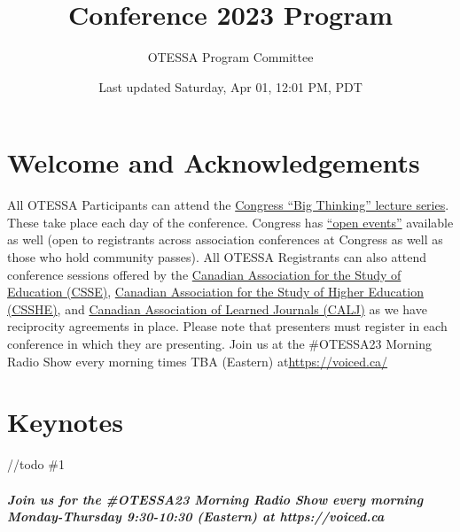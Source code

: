 \documentclass[
]{book}
\title{Conference 2023 Program}
\author{OTESSA Program Committee}
\date{Last updated Saturday, Apr 01, 12:01 PM, PDT}
\begin{document}
\maketitle

{
\setcounter{tocdepth}{1}
\tableofcontents
}
\hypertarget{welcome-and-acknowledgements}{%
\chapter*{Welcome and Acknowledgements}\label{welcome-and-acknowledgements}}

All OTESSA Participants can attend the \href{https://www.federationhss.ca/en/congress/congress-2022/open-programming}{Congress ``Big Thinking'' lecture series}. These take place each day of the conference. Congress has \href{https://www.federationhss.ca/en/congress/congress-2022/calendar-open-events}{``open events''} available as well (open to registrants across association conferences at Congress as well as those who hold community passes).
All OTESSA Registrants can also attend conference sessions offered by the \href{https://csse-scee.ca/}{Canadian Association for the Study of Education (CSSE)}, \href{https://csshe-scees.ca/}{Canadian Association for the Study of Higher Education (CSSHE)}, and \href{https://www.calj-acrs.ca/}{Canadian Association of Learned Journals (CALJ)} as we have reciprocity agreements in place. Please note that presenters must register in each conference in which they are presenting.
Join us at the \#OTESSA23 Morning Radio Show every morning times TBA (Eastern) at\url{https://voiced.ca/}

\hypertarget{keynotes}{%
\chapter*{Keynotes}\label{keynotes}}

//todo \#1

\begin{protip}
\hypertarget{join-us-for-the-otessa23-morning-radio-show-every-morning-monday-thursday-930-1030-eastern-at-httpsvoiced.ca}{%
\paragraph{Join us for the \#OTESSA23 Morning Radio Show every morning
Monday-Thursday 9:30-10:30 (Eastern) at
https://voiced.ca}\label{join-us-for-the-otessa23-morning-radio-show-every-morning-monday-thursday-930-1030-eastern-at-httpsvoiced.ca}}
\end{protip}
\end{document}
